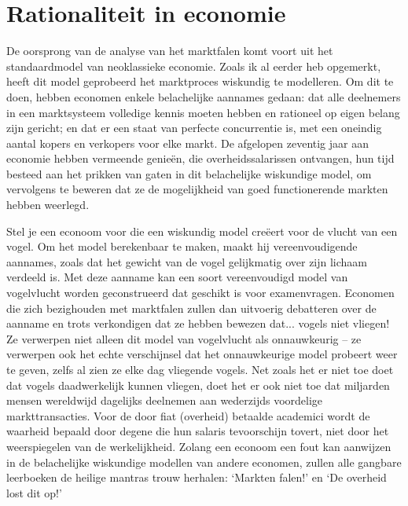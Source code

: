 \documentclass[
  a5paper,
  smalldemyvopaper,11pt,twoside,onecolumn,openright,extrafontsizes,
hidelinks]{memoir}
\begin{document}
\section{Rationaliteit in economie}\label{rationaliteit-in-economie}

De oorsprong van de analyse van het marktfalen komt voort uit het
standaardmodel van neoklassieke economie. Zoals ik al eerder heb
opgemerkt, heeft dit model geprobeerd het marktproces wiskundig te
modelleren. Om dit te doen, hebben economen enkele belachelijke aannames
gedaan: dat alle deelnemers in een marktsysteem volledige kennis moeten
hebben en rationeel op eigen belang zijn gericht; en dat er een staat
van perfecte concurrentie is, met een oneindig aantal kopers en
verkopers voor elke markt. De afgelopen zeventig jaar aan economie
hebben vermeende genieën, die overheidssalarissen ontvangen, hun tijd
besteed aan het prikken van gaten in dit belachelijke wiskundige model,
om vervolgens te beweren dat ze de mogelijkheid van goed functionerende
markten hebben weerlegd.

Stel je een econoom voor die een wiskundig model creëert voor de vlucht
van een vogel. Om het model berekenbaar te maken, maakt hij
vereenvoudigende aannames, zoals dat het gewicht van de vogel
gelijkmatig over zijn lichaam verdeeld is. Met deze aanname kan een
soort vereenvoudigd model van vogelvlucht worden geconstrueerd dat
geschikt is voor examenvragen. Economen die zich bezighouden met
marktfalen zullen dan uitvoerig debatteren over de aanname en trots
verkondigen dat ze hebben bewezen dat... vogels niet vliegen! Ze
verwerpen niet alleen dit model van vogelvlucht als onnauwkeurig -- ze
verwerpen ook het echte verschijnsel dat het onnauwkeurige model
probeert weer te geven, zelfs al zien ze elke dag vliegende vogels. Net
zoals het er niet toe doet dat vogels daadwerkelijk kunnen vliegen, doet
het er ook niet toe dat miljarden mensen wereldwijd dagelijks deelnemen
aan wederzijds voordelige markttransacties. Voor de door fiat (overheid)
betaalde academici wordt de waarheid bepaald door degene die hun salaris
tevoorschijn tovert, niet door het weerspiegelen van de werkelijkheid.
Zolang een econoom een fout kan aanwijzen in de belachelijke wiskundige
modellen van andere economen, zullen alle gangbare leerboeken de heilige
mantras trouw herhalen: `Markten falen!' en `De overheid lost dit op!'
\end{document}
